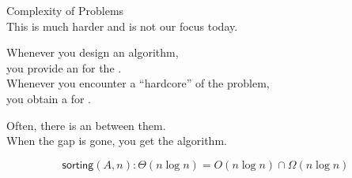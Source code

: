 \begin{frame}{}
  \begin{center}
  \end{center}


  \pause
  \begin{center}
    Complexity of Problems  \\[8pt] \pause
    This is much harder and is not our focus today.
  \end{center}
\end{frame}

\begin{frame}{}

  \pause
  \begin{center}
    Whenever you design an algorithm, \\[6pt] \pause
    you provide an  for the .  \\[15pt] \pause
    Whenever you encounter a ``hardcore'' of the problem, \\[6pt] \pause
    you obtain a  for .  \\[20pt] \pause

    Often, there is an  between them. \\[8pt] \pause
    When the gap is gone, you get the  algorithm.
  \end{center}

  \pause
  \[
    \textsf{sorting}(A, n): \Theta(n \log n) = O(n \log n) \cap \Omega(n \log n)
  \]
\end{frame}
